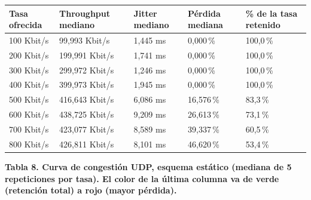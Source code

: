 \documentclass[11pt,a4paper]{article}
\newcommand{\figcaption}[1]{\par\noindent\footnotesize\textbf{#1}\par\vspace{0.4cm}}
\begin{document}
\needspace{1cm}
\begin{center}
\begin{minipage}{0.96\linewidth}
\centering
\small
\begin{tabular}{@{}p{2.1cm}p{3cm}p{2.3cm}p{2.3cm}p{2.9cm}@{}}
\toprule
\textbf{Tasa ofrecida} & \textbf{Throughput mediano} & \textbf{Jitter mediano} & \textbf{P\'erdida mediana} & \textbf{\% de la tasa retenido} \\
\midrule
100 Kbit/s & 99,993 Kbit/s & 1,445 ms & 0,000\,\% & \cellcolor{green!20}100,0\,\% \\
200 Kbit/s & 199,991 Kbit/s & 1,741 ms & 0,000\,\% & \cellcolor{green!20}100,0\,\% \\
300 Kbit/s & 299,972 Kbit/s & 1,246 ms & 0,000\,\% & \cellcolor{green!20}100,0\,\% \\
400 Kbit/s & 399,973 Kbit/s & 1,945 ms & 0,000\,\% & \cellcolor{green!20}100,0\,\% \\
500 Kbit/s & 416,643 Kbit/s & 6,086 ms & 16,576\,\% & \cellcolor{yellow!35}83,3\,\% \\
600 Kbit/s & 438,725 Kbit/s & 9,209 ms & 26,613\,\% & \cellcolor{orange!35}73,1\,\% \\
700 Kbit/s & 423,077 Kbit/s & 8,589 ms & 39,337\,\% & \cellcolor{orange!55}60,5\,\% \\
800 Kbit/s & 426,811 Kbit/s & 8,101 ms & 46,620\,\% & \cellcolor{red!45}53,4\,\% \\
\bottomrule
\end{tabular}
\par\vspace{0.1cm}
\figcaption{Tabla 8. Curva de congesti\'on UDP, esquema est\'atico (mediana de 5 repeticiones por tasa). El color de la \'ultima columna va de verde (retenci\'on total) a rojo (mayor p\'erdida).}
\end{minipage}
\end{center}
\end{document}

